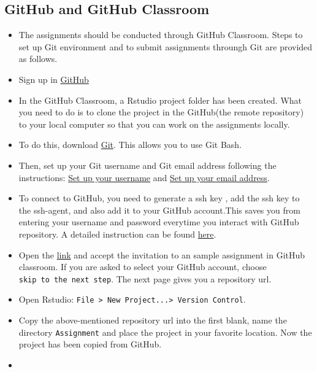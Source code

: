 \documentclass[
]{book}
\begin{document}
\hypertarget{github-and-github-classroom}{%
\subsection{GitHub and GitHub Classroom}\label{github-and-github-classroom}}

\begin{itemize}
\item
  The assignments should be conducted through GitHub Classroom. Steps to set up Git environment and to submit assignments throungh Git are provided as follows.
\item
  Sign up in \href{https://github.com/}{GitHub}
\item
  In the GitHub Classroom, a Rstudio project folder has been created. What you need to do is to clone the project in the GitHub(the remote repository) to your local computer so that you can work on the assignments locally.
\item
  To do this, download \href{https://git-scm.com/download/win}{Git}. This allows you to use Git Bash.
\item
  Then, set up your Git username and Git email address following the instructions: \href{https://docs.github.com/en/github/using-git/setting-your-username-in-git}{Set up your username} and \href{https://docs.github.com/en/github/setting-up-and-managing-your-github-user-account/setting-your-commit-email-address}{Set up your email address}.
\item
  To connect to GitHub, you need to generate a ssh key , add the ssh key to the ssh-agent, and also add it to your GitHub account.This saves you from entering your username and password everytime you interact with GitHub repository. A detailed instruction can be found \href{https://docs.github.com/en/github/authenticating-to-github/connecting-to-github-with-ssh}{here}.
\item
  Open the \href{https://classroom.github.com/a/gyfGNzpF}{link} and accept the invitation to an sample assignment in GitHub classroom. If you are asked to select your GitHub account, choose \texttt{skip\ to\ the\ next\ step}. The next page gives you a repository url.
\item
  Open Rstudio: \texttt{File\ \textgreater{}\ New\ Project...\textgreater{}\ Version\ Control}.
\item
  Copy the above-mentioned repository url into the first blank, name the directory \texttt{Assignment} and place the project in your favorite location. Now the project has been copied from GitHub.
\item

\end{itemize}
\end{document}
